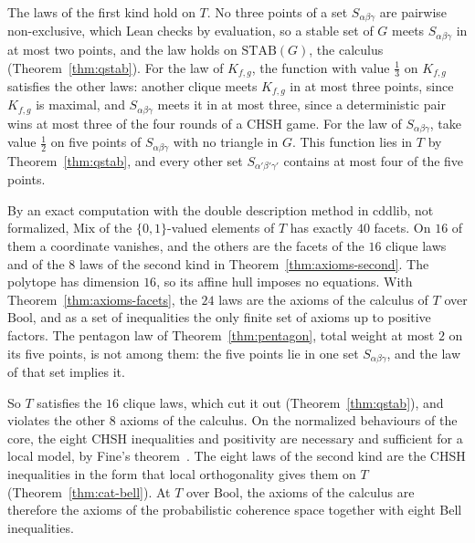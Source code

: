 \noindent
The laws of the first kind hold on $T$. No three points of a set
$S_{\alpha\beta\gamma}$ are pairwise non-exclusive, which Lean checks by
evaluation, so a stable set of $G$ meets $S_{\alpha\beta\gamma}$ in at
most two points, and the law holds on $\mathrm{STAB}(G)$, the calculus
(Theorem~\ref{thm:qstab}). For the law of $K_{f,g}$, the function with
value $\tfrac13$ on $K_{f,g}$ satisfies the other laws: another clique
meets $K_{f,g}$ in at most three points, since $K_{f,g}$ is maximal, and
$S_{\alpha\beta\gamma}$ meets it in at most three, since a deterministic
pair wins at most three of the four rounds of a CHSH game. For the law
of $S_{\alpha\beta\gamma}$, take value $\tfrac12$ on five points of
$S_{\alpha\beta\gamma}$ with no triangle in $G$. This function lies in
$T$ by Theorem~\ref{thm:qstab}, and every other set
$S_{\alpha'\beta'\gamma'}$ contains at most four of the five points.

By an exact computation with the double description method in
\textsf{cddlib}, not formalized, $\mathrm{Mix}$ of the $\{0,1\}$-valued
elements of $T$ has exactly $40$ facets. On $16$ of them a coordinate
vanishes, and the others are the facets of the $16$ clique laws and of
the $8$ laws of the second kind in Theorem~\ref{thm:axioms-second}. The
polytope has dimension $16$, so its affine hull imposes no equations.
With Theorem~\ref{thm:axioms-facets}, the $24$ laws are the axioms of the
calculus of $T$ over $\mathrm{Bool}$, and as a set of inequalities the
only finite set of axioms up to positive factors. The pentagon law of Theorem~\ref{thm:pentagon},
total weight at most $2$ on its five points, is not among them: the five
points lie in one set $S_{\alpha\beta\gamma}$, and the law of that set
implies it.

So $T$ satisfies the $16$ clique laws, which cut it out
(Theorem~\ref{thm:qstab}), and violates the other $8$ axioms of the
calculus. On the normalized behaviours of the core, the eight CHSH
inequalities and positivity are necessary and sufficient for a local
model, by Fine's theorem~\cite{fine1982}. The eight laws of the second
kind are the CHSH inequalities in the form that local orthogonality gives
them on $T$ (Theorem~\ref{thm:cat-bell}). At $T$ over $\mathrm{Bool}$,
the axioms of the calculus are therefore the axioms of the probabilistic
coherence space together with eight Bell inequalities.
